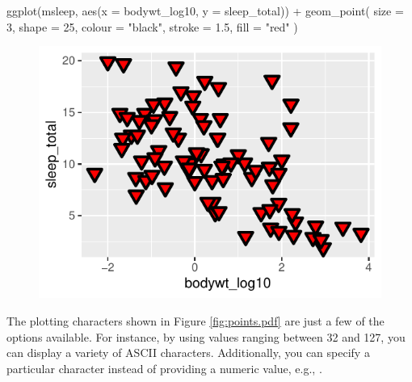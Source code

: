 \begin{inR}
ggplot(msleep, aes(x = bodywt_log10, y = sleep_total)) +
  geom_point(
    size = 3,
    shape = 25,
    colour = "black",
    stroke = 1.5,
    fill = "red"
  )
\end{inR}

\vspace{2em}

\begin{figure}[H]
\includegraphics[scale = 0.75]{graphics/ch2Figs/ggEx_6.pdf}
\end{figure}

\noindent
The plotting characters shown in Figure \ref{fig:points.pdf} are just a few of the options available. For instance, by using values ranging between 32 and 127, you can display a variety of ASCII characters. Additionally, you can specify a particular character instead of providing a numeric value, e.g., .

\vspace{2em}

